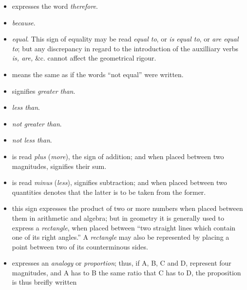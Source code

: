         \begin{itemize}
            \item[\therefore] expresses the word \textit{therefore}.
            \item[\because]  \textit{because}.
            \item[\equals]  \textit{equal}. This sign of 
                equality may be read \textit{equal to}, or \textit{is 
                equal to}, or \textit{are equal to}; but any discrepancy 
                in regard to the introduction of the auxilliary verbs 
                \textit{is, are, }\&c. cannot affect the geometrical 
                rigour. 
            \item[\notequals] means the same as if the words ``not equal'' 
                were written.\item[\greater] signifies \textit{greater 
                than}.
            \item[\less]  \textit{less than}.
            \item[\notgreater] \textit{not greater than}.
            \item[\notless] \textit{not less than}. 
            \item[\plus] is read \textit{plus} (\textit{more}), the sign 
                of addition; and when placed between two magnitudes, 
                signifies their sum. 
            \item[\minus] is read \textit{minus} (\textit{less}), 
                signifies subtraction; and when placed between two 
                quantities denotes that the latter is to be taken from the 
                former. 
            \item[\cross] this sign expresses the product of two or more 
                numbers when placed between them in arithmetic and 
                algebra; but in geometry it is generally used to express a 
                \textit{rectangle}, when placed between ``two straight 
                lines which contain one of its right angles.'' A 
                \textit{rectangle} may also be represented by placing a 
                point between two of its counterminous sides. 

            \item[\isto \as \isto] expresses an \textit{analogy} or 
                \textit{proportion}; thus, if A, B, C and D, represent 
                four magnitudes, and A has to B the same ratio that C has 
                to D, the proposition is thus breifly written 


\end{itemize}
